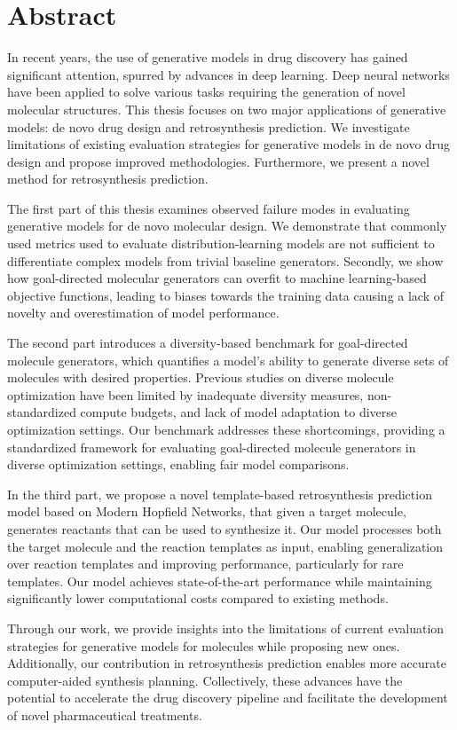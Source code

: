
{%
\chapter*{Abstract}
In recent years, the use of generative models in drug discovery has gained significant attention,
spurred by advances in deep learning. Deep neural networks have been applied to solve various tasks
requiring the generation of novel molecular structures. This thesis focuses on two major
applications of generative models: de novo drug design and retrosynthesis prediction. We investigate
limitations of existing evaluation strategies for generative models in de novo drug design and
propose improved methodologies. Furthermore, we present a novel method for retrosynthesis
prediction.

The first part of this thesis examines observed failure modes in evaluating generative models for de
novo molecular design. We demonstrate that commonly used metrics used to evaluate
distribution-learning models are not sufficient to differentiate complex models from trivial
baseline generators. Secondly, we show how goal-directed molecular generators can overfit to machine
learning-based objective functions, leading to biases towards the training data causing a lack of
novelty and overestimation of model performance.

The second part introduces a diversity-based benchmark for goal-directed molecule generators, which
quantifies a model's ability to generate diverse sets of molecules with desired properties. Previous
studies on diverse molecule optimization have been limited by inadequate diversity measures,
non-standardized compute budgets, and lack of model adaptation to diverse optimization settings. Our
benchmark addresses these shortcomings, providing a standardized framework for evaluating
goal-directed molecule generators in diverse optimization settings, enabling fair model
comparisons.

In the third part, we propose a novel template-based retrosynthesis prediction model based on Modern
Hopfield Networks, that given a target molecule, generates reactants that can be used to synthesize
it. Our model processes both the target molecule and the reaction templates as input, enabling
generalization over reaction templates and improving performance, particularly for rare templates.
Our model achieves state-of-the-art performance while maintaining significantly lower computational
costs compared to existing methods.

Through our work, we provide insights into the limitations of current evaluation strategies for
generative models for molecules while proposing new ones. Additionally, our
contribution in retrosynthesis prediction enables more accurate computer-aided synthesis planning.
Collectively, these advances have the potential to accelerate the drug discovery pipeline and
facilitate the development of novel pharmaceutical treatments.
}%